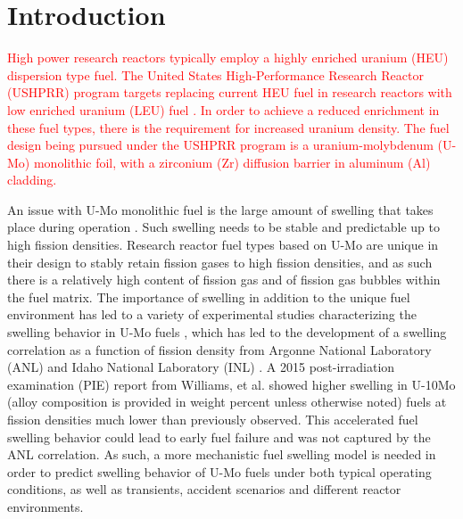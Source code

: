 \documentclass[default]{sn-jnl}%
\begin{document}

\maketitle


\section{Introduction}\label{sec1}
\textcolor{red}{
High power research reactors typically employ a highly enriched uranium (HEU) dispersion type fuel. The United States High-Performance Research Reactor (USHPRR) program targets replacing current HEU fuel in research reactors with low enriched uranium (LEU) fuel \cite{snelgrove1997}. In order to achieve a reduced enrichment in these fuel types, there is the requirement for increased uranium density. The fuel design being pursued under the USHPRR program is a uranium-molybdenum (U-Mo) monolithic foil, with a zirconium (Zr) diffusion barrier in aluminum (Al) cladding.
}

An issue with U-Mo monolithic fuel is the large amount of swelling that takes place during operation \cite{hofman1997}. Such swelling needs to be stable and predictable up to high fission densities. Research reactor fuel types based on U-Mo are unique in their design to stably retain fission gases to high fission densities, and as such there is a relatively high content of fission gas and of fission gas bubbles within the fuel matrix. The importance of swelling in addition to the unique fuel environment has led to a variety of experimental studies characterizing the swelling behavior in U-Mo fuels \cite{rest2009, kim_anl08, meyer2002, kim2013}, which has led to the development of a swelling correlation as a function of fission density from Argonne National Laboratory (ANL) \cite{kim2011} and Idaho National Laboratory (INL) \cite{umo_prelim_report2017}. A 2015 post-irradiation examination (PIE) report \cite{afip6report} from Williams, et al. showed higher swelling in U-10Mo (alloy composition is provided in weight percent unless otherwise noted) fuels at fission densities much lower than previously observed. This accelerated fuel swelling behavior could lead to early fuel failure and was not captured by the ANL correlation. As such, a more mechanistic fuel swelling model is needed in order to predict swelling behavior of U-Mo fuels under both typical operating conditions, as well as transients, accident scenarios and different reactor environments.
\end{document}

